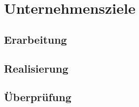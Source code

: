\section{Unternehmensziele}
\label{sec:uziele}

\subsection{Erarbeitung}

\subsection{Realisierung}

\subsection{Überprüfung}
